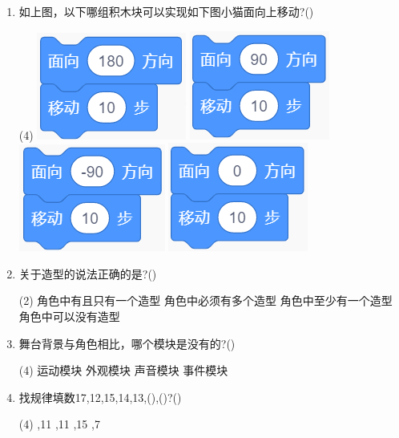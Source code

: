 \documentclass[10.5pt, a4paper]{article}
\begin{document}
\begin{enumerate}
        \item 如上图，以下哪组积木块可以实现如下图小猫面向上移动?(\qquad)
        \begin{tasks}(4)
            \task \includegraphics[width=.1\textwidth]{21a.png}
            \task \includegraphics[width=.1\textwidth]{21b.png}
            \task \includegraphics[width=.1\textwidth]{21c.png}
            \task \includegraphics[width=.1\textwidth]{21d.png}
        \end{tasks}

        \item 关于造型的说法正确的是?(\qquad)
        \begin{tasks}(2)
            \task 角色中有且只有一个造型
            \task 角色中必须有多个造型
            \task 角色中至少有一个造型
            \task 角色中可以没有造型
        \end{tasks}

        \item 舞台背景与角色相比，哪个模块是没有的?(\qquad)
        \begin{tasks}(4)
            \task 运动模块
            \task 外观模块
            \task 声音模块
            \task 事件模块
        \end{tasks}
    
        \item 找规律填数17,12,15,14,13,(\quad),(\quad)?(\qquad)
        \begin{tasks}(4)
            ,11
            ,11
            ,15
            ,7
        \end{tasks}


\end{enumerate}
\end{document}
